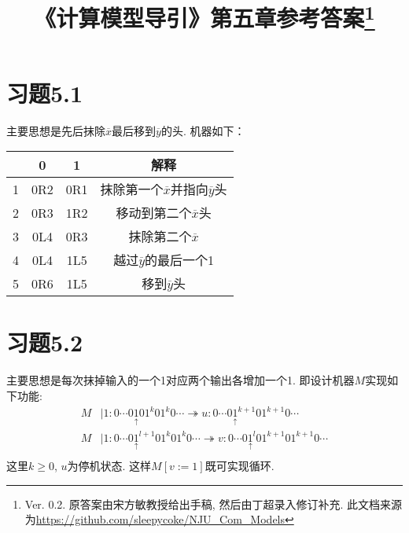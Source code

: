 \documentclass{article}
\newcommand*{\pt}[1]{\ensuremath{\underset{\uparrow}{#1}}}
\begin{document}
\title{《计算模型导引》第五章参考答案\footnote{Ver. 0.2. 原答案由宋方敏教授给出手稿, 然后由丁超录入修订补充. 此文档来源为\url{https://github.com/sleepycoke/NJU_Com_Models}}}
\maketitle

\section*{习题5.1}
主要思想是先后抹除$\overline x$最后移到$\overline y$的头. 
机器如下：
\begin{center}
	
\begin{tabular}{|c|c|c|c|}
	\hline
	&0&1&解释\\
	\hline
	1&0R2&0R1&抹除第一个$\overline x$并指向$\overline y$头\\
	2&0R3&1R2&移动到第二个$\overline x$头\\
	3&0L4&0R3&抹除第二个$\overline x$\\
	4&0L4&1L5&越过$\overline y$的最后一个1\\
	5&0R6&1L5&移到$\overline y$头\\
	\hline
\end{tabular}
\end{center}


\section*{习题5.2}
主要思想是每次抹掉输入的一个1对应两个输出各增加一个1. 
即设计机器$M$实现如下功能:\\
\begin{align*}
	M &| 1 : 0\cdots0\pt101^k01^k0\cdots \twoheadrightarrow u : 0\cdots0\pt1^{k+1}01^{k+1}0\cdots\\
	M &| 1 : 0\cdots0\pt1^{l+1}01^k01^k0\cdots \twoheadrightarrow v : 0\cdots0\pt1^l01^{k+1}01^{k+1}0\cdots\\
\end{align*}
这里$k\ge 0$, $u$为停机状态. 这样$M[v:=1]$既可实现循环. 
\end{document}
